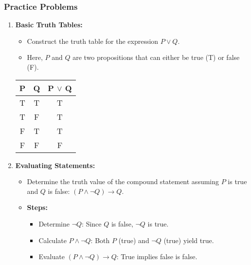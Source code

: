 \documentclass[aspectratio=169]{beamer}
\begin{document}
\begin{frame}[fragile]
    \frametitle{Practice Problems}
    \begin{enumerate}
        \item \textbf{Basic Truth Tables:}
        \begin{itemize}
            \item Construct the truth table for the expression $P \lor Q$.
            \item Here, $P$ and $Q$ are two propositions that can either be true (T) or false (F).
        \end{itemize}
        \begin{center}
            \begin{tabular}{|c|c|c|}
                \hline
                P & Q & P $\lor$ Q \\
                \hline
                T & T & T \\
                T & F & T \\
                F & T & T \\
                F & F & F \\
                \hline
            \end{tabular}
        \end{center}
        
        \item \textbf{Evaluating Statements:}
        \begin{itemize}
            \item Determine the truth value of the compound statement assuming $P$ is true and $Q$ is false: $(P \land \neg Q) \rightarrow Q$.
            \item \textbf{Steps:}
            \begin{itemize}
                \item Determine $\neg Q$: Since $Q$ is false, $\neg Q$ is true.
                \item Calculate $P \land \neg Q$: Both $P$ (true) and $\neg Q$ (true) yield true.
                \item Evaluate $(P \land \neg Q) \rightarrow Q$: True implies false is false.
            \end{itemize}
        \end{itemize}
    \end{enumerate}
\end{frame}
\end{document}
